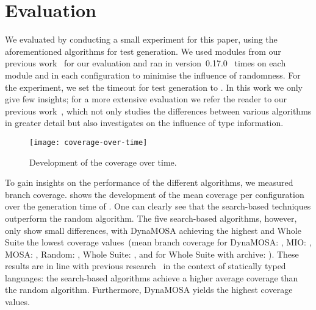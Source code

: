 \section{Evaluation}\label{sec:evaluation}

We evaluated \pynguin
by conducting a small experiment for this paper,
using the aforementioned algorithms for test generation.
%
We used \numModules modules from our previous work~\cite{LKF21}
for our evaluation
and ran \pynguin in version~0.17.0~\cite{Luk22Pynguin0170}
\numIterations times on each module
and in each configuration
to minimise the influence of randomness.
%
For the experiment,
we set the timeout for test generation to \timeout.%
%
In this work we only give few insights;
%
for a more extensive evaluation
we refer the reader to our previous work~\cite{LKF20,LKF21},
which not only studies the differences
between various algorithms in greater detail
but also investigates on the influence of type information.
%

\begin{figure}[t]
  \centering
  \texttt{[image: coverage-over-time]}
  \caption{\label{fig:coverage-over-time}Development of the coverage over time.}
\end{figure}

To gain insights on the performance of the different algorithms,
we measured branch coverage.
%
 shows the development
of the mean coverage per configuration
over the generation time of \timeout.
%
One can clearly see that the search-based techniques
outperform the random algorithm.
%
The five search-based algorithms,
however,
only show small differences,
with DynaMOSA achieving the highest
and Whole Suite the lowest coverage values~(mean branch coverage for
DynaMOSA\@: \avgCoverageDynaMOSA,
MIO\@: \avgCoverageMIO,
MOSA\@: \avgCoverageMOSA,
Random\@: \avgCoverageRandom,
Whole Suite\@: \avgCoverageWS,
and for Whole Suite with archive\@: \avgCoverageWSA).
%
These results are in line with previous research~\cite{CAF+18,PKT18a}
in the context of statically typed languages:
%
the search-based algorithms achieve a higher average coverage
than the random algorithm.
%
Furthermore, DynaMOSA yields the highest coverage values.
%

